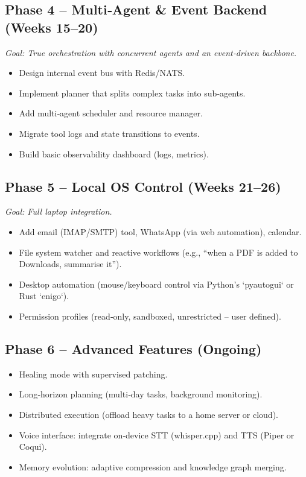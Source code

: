 \documentclass[12pt,a4paper]{article}
\begin{document}
\subsection{Phase 4 – Multi‑Agent \& Event Backend (Weeks 15–20)}
\emph{Goal: True orchestration with concurrent agents and an event‑driven backbone.}
\begin{itemize}[leftmargin=*]
    \item Design internal event bus with Redis/NATS.
    \item Implement planner that splits complex tasks into sub‑agents.
    \item Add multi‑agent scheduler and resource manager.
    \item Migrate tool logs and state transitions to events.
    \item Build basic observability dashboard (logs, metrics).
\end{itemize}

\subsection{Phase 5 – Local OS Control (Weeks 21–26)}
\emph{Goal: Full laptop integration.}
\begin{itemize}[leftmargin=*]
    \item Add email (IMAP/SMTP) tool, WhatsApp (via web automation), calendar.
    \item File system watcher and reactive workflows (e.g., “when a PDF is added to Downloads, summarise it”).
    \item Desktop automation (mouse/keyboard control via Python’s `pyautogui` or Rust `enigo`).
    \item Permission profiles (read‑only, sandboxed, unrestricted – user defined).
\end{itemize}

\subsection{Phase 6 – Advanced Features (Ongoing)}
\begin{itemize}[leftmargin=*]
    \item Healing mode with supervised patching.
    \item Long‑horizon planning (multi‑day tasks, background monitoring).
    \item Distributed execution (offload heavy tasks to a home server or cloud).
    \item Voice interface: integrate on‑device STT (whisper.cpp) and TTS (Piper or Coqui).
    \item Memory evolution: adaptive compression and knowledge graph merging.
\end{itemize}
\end{document}
